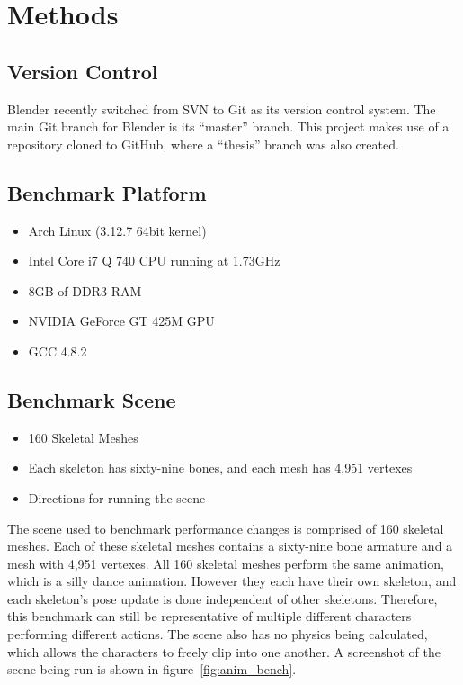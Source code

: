 \section{Methods}

\subsection{Version Control}
Blender recently switched from SVN\cite{svn} to Git\cite{git} as its version control system\cite{blendergit}.
The main Git branch for Blender is its ``master'' branch.
This project makes use of a repository cloned to GitHub\cite{github}, where a ``thesis'' branch was also created.

\subsection{Benchmark Platform}
\label{sec:bench_platform}
\ifsummaries
\begin{itemize}
 \item Arch Linux (3.12.7 64bit kernel)
 \item Intel Core i7 Q 740 CPU running at 1.73GHz
 \item 8GB of DDR3 RAM
 \item NVIDIA GeForce GT 425M GPU
 \item GCC 4.8.2
\end{itemize}
\fi


\subsection{Benchmark Scene}
\label{sec:bench_scene}
\ifsummaries
\begin{itemize}
 \item 160 Skeletal Meshes
 \item Each skeleton has sixty-nine bones, and each mesh has 4,951 vertexes
 \item Directions for running the scene
\end{itemize}
\fi

The scene used to benchmark performance changes is comprised of 160 skeletal meshes.
Each of these skeletal meshes contains a sixty-nine bone armature and a mesh with 4,951 vertexes.
All 160 skeletal meshes perform the same animation, which is a silly dance animation.
However they each have their own skeleton, and each skeleton's pose update is done independent of other skeletons.
Therefore, this benchmark can still be representative of multiple different characters performing different actions.
The scene also has no physics being calculated, which allows the characters to freely clip into one another.
A screenshot of the scene being run is shown in figure~\ref{fig:anim_bench}.

